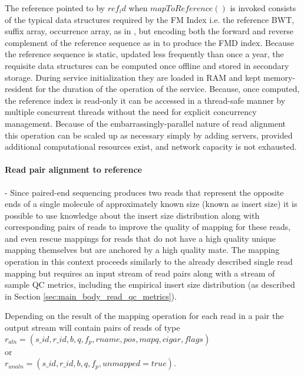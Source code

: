 The reference pointed to by $ref_id$ when $mapToReference()$ is invoked consists of the typical data structures required by the FM Index i.e. the reference BWT, suffix array, occurrence array, as in \autocite{ferragina2000opportunistic}, but encoding both the forward and reverse complement of the reference sequence as in \autocite{Li2013} to produce the FMD index. Because the reference sequence is static, updated less frequently than once a year, the requisite data structures can be computed once offline and stored in secondary storage. During service initialization they are loaded in RAM and kept memory-resident for the duration of the operation of the service. Because, once computed, the reference index is read-only it can be accessed in a thread-safe manner by multiple concurrent threads without the need for explicit concurrency management. Because of the embarrassingly-parallel nature of read alignment this operation can be scaled up as necessary simply by adding servers, provided additional computational resources exist, and network capacity is not exhausted.

\paragraph{Read pair alignment to reference} - Since paired-end sequencing produces two reads that represent the opposite ends of a single molecule of approximately known size (known as insert size) it is possible to use knowledge about the insert size distribution along with corresponding pairs of reads to improve the quality of mapping for these reads, and even rescue mappings for reads that do not have a high quality unique mapping themselves but are anchored by a high quality mate. The mapping operation in this context proceeds similarly to the already described single read mapping but requires an input stream of read pairs along with a stream of sample QC metrics, including the empirical insert size distribution (as described in Section \ref{sec:main_body_read_qc_metrics}).

Depending on the result of the mapping operation for each read in a pair the output stream will contain pairs of reads of type \\
$r_{aln} = (s\_id, r\_id, b, q, f_p, rname, pos, mapq, cigar, flags)$\\
or \\
$r_{unaln} = (s\_id, r\_id, b, q, f_p, unmapped=true)$. 

